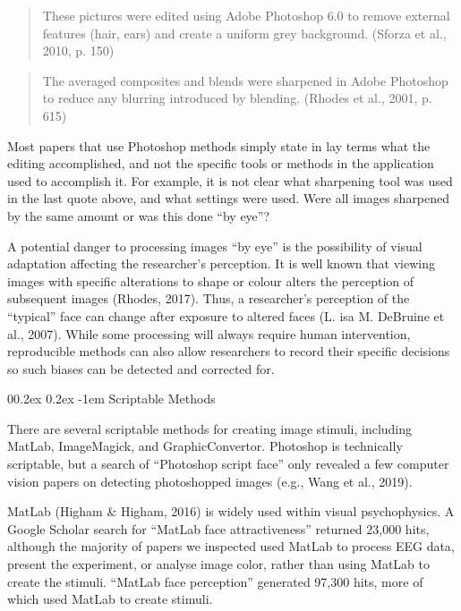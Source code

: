 \documentclass[
  doc,floatsintext]{apa6}
\makeatletter
\let\oldparagraph\paragraph
\renewcommand{\paragraph}[1]{\oldparagraph{#1}\mbox{}}
\renewcommand{\paragraph}{\@startsection{paragraph}{4}{\parindent}%
  {0\baselineskip \@plus 0.2ex \@minus 0.2ex}%
  {-1em}%
  {\normalfont\normalsize\bfseries\itshape\typesectitle}}
\makeatother
\begin{document}
\begin{quote}
These pictures were edited using Adobe Photoshop 6.0 to remove external features (hair, ears) and create a uniform grey background. (Sforza et al., 2010, p. 150)
\end{quote}

\begin{quote}
The averaged composites and blends were sharpened in Adobe Photoshop to reduce any blurring introduced by blending. (Rhodes et al., 2001, p. 615)
\end{quote}

Most papers that use Photoshop methods simply state in lay terms what the editing accomplished, and not the specific tools or methods in the application used to accomplish it. For example, it is not clear what sharpening tool was used in the last quote above, and what settings were used. Were all images sharpened by the same amount or was this done ``by eye''?

A potential danger to processing images ``by eye'' is the possibility of visual adaptation affecting the researcher's perception. It is well known that viewing images with specific alterations to shape or colour alters the perception of subsequent images (Rhodes, 2017). Thus, a researcher's perception of the ``typical'' face can change after exposure to altered faces (L. isa M. DeBruine et al., 2007). While some processing will always require human intervention, reproducible methods can also allow researchers to record their specific decisions so such biases can be detected and corrected for.

\hypertarget{scriptable-methods}{%
\paragraph{Scriptable Methods}\label{scriptable-methods}}

There are several scriptable methods for creating image stimuli, including MatLab, ImageMagick, and GraphicConvertor. Photoshop is technically scriptable, but a search of ``Photoshop script face'' only revealed a few computer vision papers on detecting photoshopped images (e.g., Wang et al., 2019).

MatLab (Higham \& Higham, 2016) is widely used within visual psychophysics. A Google Scholar search for ``MatLab face attractiveness'' returned 23,000 hits, although the majority of papers we inspected used MatLab to process EEG data, present the experiment, or analyse image color, rather than using MatLab to create the stimuli. ``MatLab face perception'' generated 97,300 hits, more of which used MatLab to create stimuli.
\end{document}
